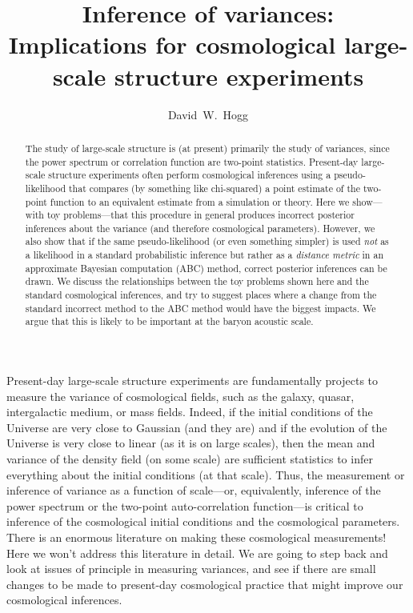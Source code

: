 \documentclass[12pt, letterpaper, preprint]{aastex}
\begin{document}
\title{Inference of variances:\\
       Implications for cosmological large-scale structure experiments}
\author{
  David~W.~Hogg
}

\begin{abstract}
The study of large-scale structure is (at present) primarily the study
of variances, since the power spectrum or correlation function are
two-point statistics.
Present-day large-scale structure experiments often perform
cosmological inferences using a pseudo-likelihood that compares (by something like chi-squared) a
point estimate of the two-point function to an equivalent estimate
from a simulation or theory.
Here we show---with toy problems---that this procedure in general
produces incorrect posterior inferences about the variance (and
therefore cosmological parameters).
However, we also show that if the same pseudo-likelihood (or even something simpler) is used
\emph{not} as a likelihood in a standard probabilistic inference but
rather as a \emph{distance metric} in an approximate Bayesian
computation (ABC) method, correct posterior inferences can be drawn.
We discuss the relationships between the toy problems shown here and
the standard cosmological inferences, and try to suggest places where
a change from the standard incorrect method to the ABC method would
have the biggest impacts.
We argue that this is likely to be important at the baryon acoustic
scale.
\end{abstract}

Present-day large-scale structure experiments are fundamentally
projects to measure the variance of cosmological fields, such as the
galaxy, quasar, intergalactic medium, or mass fields.
Indeed, if the initial conditions of the Universe are very close to
Gaussian (and they are) and if the evolution of the Universe is very
close to linear (as it is on large scales), then the mean and variance
of the density field (on some scale) are sufficient statistics to
infer everything about the initial conditions (at that scale).
Thus, the measurement or inference of variance as a function of
scale---or, equivalently, inference of the power spectrum or the
two-point auto-correlation function---is critical to inference of the
cosmological initial conditions and the cosmological parameters.
There is an enormous literature on making these cosmological
measurements!
Here we won't address this literature in detail.
We are going to step back and look at issues of principle in measuring
variances, and see if there are small changes to be made to
present-day cosmological practice that might improve our cosmological
inferences.
\end{document}
